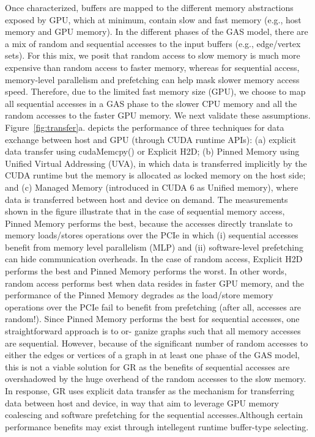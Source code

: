 Once characterized, buffers are mapped to the different memory abstractions exposed by GPU, which at minimum, contain slow and fast memory (e.g., host memory and GPU memory). In the different phases of the GAS model, there are a mix of random and sequential accesses to the input buffers (e.g., edge/vertex sets). For this mix, we posit that random access to slow memory is much more expensive than random access to faster memory, whereas for sequential access, memory-level parallelism and prefetching can help mask slower memory access speed. Therefore, due to the limited fast memory size (GPU), we choose to map all sequential accesses in a GAS phase to the slower CPU memory and all the random accesses to the faster GPU memory. We next validate these assumptions. Figure~\ref{fig:transfer}a. depicts the performance of three techniques for data exchange between host and GPU (through CUDA runtime APIs): (a) explicit data transfer using cudaMemcpy() or Explicit H2D; (b) Pinned Memory using Unified Virtual Addressing (UVA), in which data is transferred implicitly by the CUDA runtime but the memory is allocated as locked memory on the host side; and (c) Managed Memory (introduced in CUDA 6 as Unified memory), where data is transferred between host and device on demand. The measurements shown in the figure illustrate that in the case of sequential memory access, Pinned Memory performs the best, because the accesses directly translate to memory loads/stores operations over the PCIe in which (i) sequential accesses benefit from memory level parallelism (MLP) and (ii) software-level prefetching can hide communication overheads. In the case of random access, Explicit H2D performs the best and Pinned Memory performs the worst. In other words, random access performs best when data resides in faster GPU memory, and the performance of the Pinned Memory degrades as the load/store memory operations over the PCIe fail to benefit from prefetching (after all, accesses are random!). Since Pinned Memory performs the best for sequential accesses, one straightforward approach is to or- ganize graphs such that all memory accesses are sequential. However, because of the significant number of random accesses to either the edges or vertices of a graph in at least one phase of the GAS model, this is not a viable solution for GR as the benefits of sequential accesses are overshadowed by the huge overhead of the random accesses to the slow memory. In response, GR uses explicit data transfer as the mechanism for transferring data between host and device, in way that aim to leverage GPU memory coalescing and software prefetching for the sequential accesses.Although certain performance benefits may exist through intellegent runtime buffer-type selecting. 


